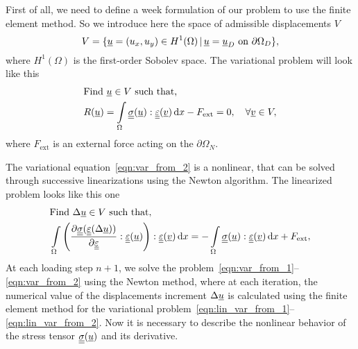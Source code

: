 \documentclass[12pt]{article}
\newcommand{\todounderline}[1]{\todo[inline, size=\scriptsize]{#1}}
\begin{document}
First of all, we need to define a week formulation of our problem to use the finite element method. So we introduce here the space of admissible displacements $V$
\begin{equation}
    V = \{\underline{u} = (u_x, u_y) \in H^1(\Omega) \, | \, \underline{u} = \underline{u}_D \text{ on } \partial\Omega_D \},
\end{equation}
where $H^1(\Omega)$ is the first-order Sobolev space. The variational problem will look like this 
\begin{align}
    & \text{Find } \underline{u} \in V \text{ such that,} \label{eqn:var_from_1} \\ 
    & R(\underline{u}) = \int\limits_\Omega\underline{\underline{\sigma}}(\underline{u}) : \underline{\underline{\varepsilon}}(\underline{v}) \, \mathrm{d} x - F_\text{ext} = 0, \quad \forall \underline{v} \in V \label{eqn:var_from_2},
\end{align}
where $F_\text{ext}$ is an external force acting on the $\partial\Omega_N$.

The variational equation~\ref{eqn:var_from_2} is a nonlinear, that can be solved through successive linearizations using the
Newton algorithm. The linearized problem looks like this one
\begin{align}
    & \text{Find } \Delta\underline{u} \in V \text{ such that,} \label{eqn:lin_var_from_1} \\ 
    & \int\limits_\Omega \left(\frac{\partial\underline{\underline{\sigma}}(\underline{\underline{\varepsilon}}(\Delta\underline{u}))}{\partial\underline{\underline{\varepsilon}}} : \underline{\underline{\varepsilon}}(\underline{u})\right) : \underline{\underline{\varepsilon}}(\underline{v}) \, \mathrm{d} x = -\int\limits_\Omega\underline{\underline{\sigma}}(\underline{u}) : \underline{\underline{\varepsilon}}(\underline{v}) \, \mathrm{d} x + F_\text{ext} \label{eqn:lin_var_from_2},
\end{align}
At each loading step $n+1$, we solve the problem~\ref{eqn:var_from_1}--\ref{eqn:var_from_2} using the Newton method, where at each iteration, the numerical value of the displacements increment $\Delta\underline{u}$ is calculated using the finite element method for the variational problem~\ref{eqn:lin_var_from_1}--\ref{eqn:lin_var_from_2}. Now it is necessary to describe the nonlinear behavior of the stress tensor $\underline{\underline{\sigma}}(\underline{u})$ and its derivative.
\end{document}
